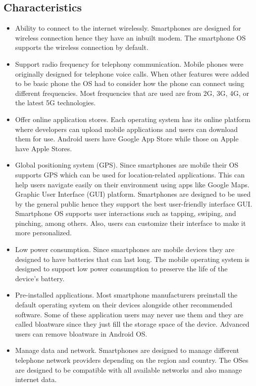 \documentclass[conference]{IEEEtran}
\begin{document}
\subsection{Characteristics}
\begin{itemize}
\item Ability to connect to the internet wirelessly. Smartphones are designed for wireless connection hence they have an inbuilt modem. The smartphone OS supports the wireless connection by default.

\item Support radio frequency for telephony communication. Mobile phones were originally designed for telephone voice calls. When other features were added to be basic phone the OS had to consider how the phone can connect using different frequencies. Most frequencies that are used are from 2G, 3G, 4G, or the latest 5G technologies.

\item Offer online application stores. Each operating system has its online platform where developers can upload mobile applications and users can download them for use. Android users have Google App Store while those on Apple have Apple Stores.

\item Global positioning system (GPS). Since smartphones are mobile their OS supports GPS which can be used for location-related applications. This can help users navigate easily on their environment using apps like Google Maps.
Graphic User Interface (GUI) platform. Smartphones are designed to be used by the general public hence they support the best user-friendly interface GUI. Smartphone OS supports user interactions such as tapping, swiping, and pinching, among others. Also, users can customize their interface to make it more personalized.

\item Low power consumption. Since smartphones are mobile devices they are designed to have batteries that can last long. The mobile operating system is designed to support low power consumption to preserve the life of the device’s battery.

\item Pre-installed applications. Most smartphone manufacturers preinstall the default operating system on their devices alongside other recommended software. Some of these application users may never use them and they are called bloatware since they just fill the storage space of the device. Advanced users can remove bloatware in Android OS.

\item Manage data and network. Smartphones are designed to manage different telephone network providers depending on the region and country. The OSes are designed to be compatible with all available networks and also manage internet data.
\end{itemize}
\end{document}

